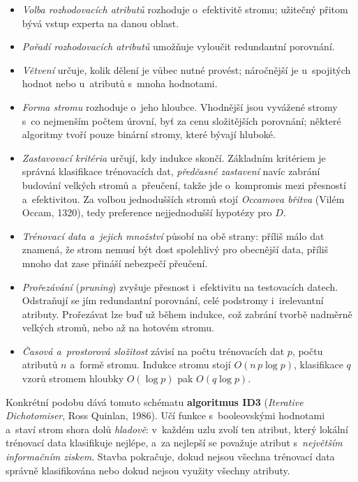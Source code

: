 \documentclass[11pt,a4paper]{article}
\theoremstyle{definition}
\begin{document}
\begin{itemize}
\item \emph{Volba rozhodovacích atributů} rozhoduje o~efektivitě stromu; užitečný přitom bývá
       vstup experta na danou oblast.
\item \emph{Pořadí rozhodovacích atributů} umožňuje vyloučit redundantní porovnání.
\item \emph{Větvení} určuje, kolik dělení je vůbec nutné provést; náročnější je u~spojitých
      hodnot nebo u~atributů s~mnoha hodnotami.
\item \emph{Forma stromu} rozhoduje o~jeho hloubce. Vhodnější jsou vyvážené stromy s~co
      nejmenším počtem úrovní, byť za cenu složitějších porovnání; některé algoritmy tvoří
      pouze binární stromy, které bývají hluboké.
\item \emph{Zastavovací kritéria} určují, kdy indukce skončí. Základním kritériem je správná
      klasifikace trénovacích dat, \emph{předčasné zastavení} navíc zabrání budování velkých
      stromů a~přeučení, takže jde o~kompromis mezi přesností a~efektivitou. Za volbou
      jednodušších stromů stojí \emph{Occamova břitva} (Vilém Occam, 1320), tedy preference
      nejjednodušší hypotézy pro $D$.
\item \emph{Trénovací data a~jejich množství} působí na obě strany: příliš málo dat znamená,
      že strom nemusí být dost spolehlivý pro obecnější data, příliš mnoho dat zase přináší
      nebezpečí přeučení.
\item \emph{Prořezávání} (\emph{pruning}) zvyšuje přesnost i~efektivitu na testovacích datech.
      Odstraňují se jím redundantní porovnání, celé podstromy i~irelevantní atributy.
      Prořezávat lze buď už během indukce, což zabrání tvorbě nadměrně velkých stromů,
      nebo až na hotovém stromu.
\item \emph{Časová a~prostorová složitost} závisí na počtu trénovacích dat $p$, počtu atributů
      $n$ a~formě stromu. Indukce stromu stojí $O(n\,p\log p)$, klasifikace $q$ vzorů stromem
      hloubky $O(\log p)$ pak $O(q\log p)$.
\end{itemize}

Konkrétní podobu dává tomuto schématu \textbf{algoritmus ID3} (\emph{Iterative Dichotomiser},
Ross Quinlan, 1986). Učí funkce s~booleovskými hodnotami a~staví strom shora dolů
\emph{hladově}: v~každém uzlu zvolí ten atribut, který lokální trénovací data klasifikuje
nejlépe, a~za nejlepší se považuje atribut s~\emph{největším informačním ziskem}. Stavba
pokračuje, dokud nejsou všechna trénovací data správně klasifikována nebo dokud nejsou
využity všechny atributy.
\end{document}
